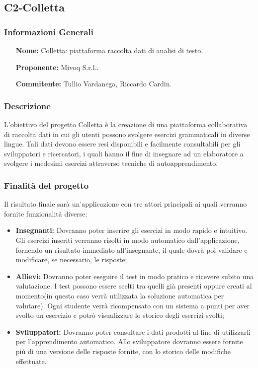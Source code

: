 \subsection{C2-Colletta} 
\subsubsection{Informazioni Generali}
\begin{itemize}
	\item[\bf Nome:] Colletta: piattaforma raccolta dati di analisi di testo.
	\item[\bf Proponente:]Mivoq S.r.l..
	\item[\bf Commitente:]Tullio Vardanega, Riccardo Cardin.
\end{itemize}
\subsubsection{Descrizione}
L'obiettivo del progetto Colletta è la creazione di una piattaforma collaborativa  di raccolta dati in cui gli utenti possono svolgere esercizi grammaticali in diverse lingue. Tali dati devono essere resi disponibili e facilmente consultabili per gli sviluppatori e ricercatori, i quali hanno il fine di insegnare ad un elaboratore a svolgere i medesimi esercizi attraverso tecniche di autoapprendimento.
\subsubsection{Finalità del progetto}
Il risultato finale sarà un'applicazione con tre attori principali ai quali verranno fornite funzionalità diverse:
\begin{itemize}
	\item \textbf{Insegnanti: }Dovranno poter inserire gli esercizi in modo rapido e intuitivo. Gli esercizi inseriti verranno risolti in modo automatico dall'applicazione, fornendo un risultato immediato all'insegnante, il quale dovrà poi validare e modificare, se necessario, le risposte;
	\item \textbf{Allievi: }Dovranno poter eseguire il test in modo pratico e ricevere subito una valutazione. I test possono essere scelti tra quelli già presenti oppure creati al momento(in questo caso verrà utilizzata la soluzione automatica per valutare). Ogni studente verrà ricompensato con un sistema a punti per aver svolto un esercizio e potrò visualizzare lo storico degli esercizi svolti;
	\item \textbf{Sviluppatori: }Dovranno poter consultare i dati prodotti al fine di utilizzarli per l'apprendimento automatico. Allo sviluppatore dovranno essere fornite più di una versione delle risposte fornite, con lo storico delle modifiche effettuate.
\end{itemize}

